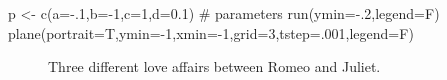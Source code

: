 \documentclass[
  a4paper,
  DIV=11,
  numbers=noendperiod,
  oneside]{scrreprt}
\newenvironment{Shaded}{}{}
\newcommand{\AttributeTok}[1]{\textcolor[rgb]{0.84,0.23,0.29}{#1}}
\newcommand{\CommentTok}[1]{\textcolor[rgb]{0.42,0.45,0.49}{#1}}
\newcommand{\DecValTok}[1]{\textcolor[rgb]{0.00,0.36,0.77}{#1}}
\newcommand{\FloatTok}[1]{\textcolor[rgb]{0.00,0.36,0.77}{#1}}
\newcommand{\FunctionTok}[1]{\textcolor[rgb]{0.44,0.26,0.76}{#1}}
\newcommand{\NormalTok}[1]{\textcolor[rgb]{0.14,0.16,0.18}{#1}}
\newcommand{\OtherTok}[1]{\textcolor[rgb]{0.44,0.26,0.76}{#1}}
\newcommand{\SpecialCharTok}[1]{\textcolor[rgb]{0.00,0.36,0.77}{#1}}
\begin{document}
\begin{Shaded}
\begin{Highlighting}[]
\NormalTok{p }\OtherTok{\textless{}{-}} \FunctionTok{c}\NormalTok{(}\AttributeTok{a=}\SpecialCharTok{{-}}\NormalTok{.}\DecValTok{1}\NormalTok{,}\AttributeTok{b=}\SpecialCharTok{{-}}\DecValTok{1}\NormalTok{,}\AttributeTok{c=}\DecValTok{1}\NormalTok{,}\AttributeTok{d=}\FloatTok{0.1}\NormalTok{) }\CommentTok{\# parameters}
\FunctionTok{run}\NormalTok{(}\AttributeTok{ymin=}\SpecialCharTok{{-}}\NormalTok{.}\DecValTok{2}\NormalTok{,}\AttributeTok{legend=}\NormalTok{F)}
\FunctionTok{plane}\NormalTok{(}\AttributeTok{portrait=}\NormalTok{T,}\AttributeTok{ymin=}\SpecialCharTok{{-}}\DecValTok{1}\NormalTok{,}\AttributeTok{xmin=}\SpecialCharTok{{-}}\DecValTok{1}\NormalTok{,}\AttributeTok{grid=}\DecValTok{3}\NormalTok{,}\AttributeTok{tstep=}\NormalTok{.}\DecValTok{001}\NormalTok{,}\AttributeTok{legend=}\NormalTok{F)}
\end{Highlighting}
\end{Shaded}

\begin{figure}


\caption{\label{fig-ch4n-img9-old-57}Three different love affairs
between Romeo and Juliet.}

\end{figure}%
\end{document}
